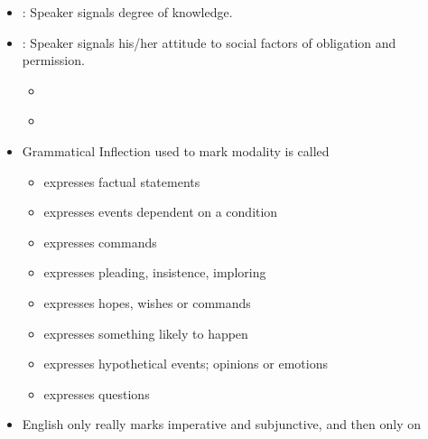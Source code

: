 \documentclass[headrule,footrule]{foils}
\begin{document}
\begin{itemize}
\item  {}: Speaker signals degree of  
knowledge.
\begin{exe}
  \ex{} 
\end{exe}
\item  {}: Speaker signals his/her attitude  
to social factors of obligation and permission.
\begin{itemize}
\item {}
  \begin{exe}
    \ex{}  
    \ex{}  
  \end{exe}
\item {}
  \begin{exe}
    \ex{}  
    \ex{}
  \end{exe}
\end{itemize}
\end{itemize}


\begin{itemize}
\item Grammatical Inflection used to mark modality is called 
  \begin{itemize}
  \item {} expresses factual statements
  \item {} expresses events dependent on a condition
  \item {} expresses commands
  \item {} expresses pleading, insistence, imploring
  \item {} expresses hopes, wishes or commands 
  \item {} expresses something likely to happen
  \item {} expresses  hypothetical events; opinions or emotions
  \item {} expresses questions
\end{itemize}
\item English only really marks imperative and subjunctive, and then only on 
  \begin{exe}
    \ix {}
    \ix {}
  \end{exe}
\end{itemize}
\end{document}
